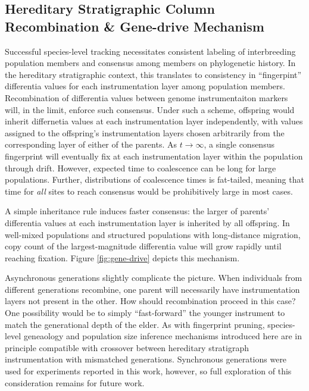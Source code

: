 \subsection{Hereditary Stratigraphic Column Recombination \& Gene-drive Mechanism}
\label{sec:gene-drive}



Successful species-level tracking necessitates consistent labeling of interbreeding population members and consensus among members on phylogenetic history.
In the hereditary stratigraphic context, this translates to consistency in ``fingerpint'' differentia values for each instrumentation layer among population members.
Recombination of differentia values between genome instrumentaiton markers will, in the limit, enforce such consensus.
Under such a scheme, offspring would inherit differnetia values at each instrumentation layer independently, with values assigned to the offspring's instrumentation layers chosen arbitrarily from the corresponding layer of either of the parents.
As $t \to \infty$, a single consensus fingerprint will eventually fix at each instrumentation layer within the population through drift.
However, expected time to coalescence can be long for large populations.
Further, distributions of coalescence times is fat-tailed, meaning that time for \textit{all} sites to reach consensus would be prohibitively large in most cases.

A simple inheritance rule induces faster consensus: the larger of parents' differentia values at each instrumentation layer is inherited by all offspring.
In well-mixed populations and structured populations with long-distance migration, copy count of the largest-magnitude differentia value will grow rapidly until reaching fixation.
Figure \ref{fig:gene-drive} depicts this mechanism.

Asynchronous generations slightly complicate the picture.
When individuals from different generations recombine, one parent will necessarily have instrumentation layers not present in the other.
How should recombination proceed in this case?
One possibility would be to simply ``fast-forward'' the younger instrument to match the generational depth of the elder.
As with fingerprint pruning, species-level geneaology and population size inference mechanisms introduced here are in principle compatible with crossover between hereditary stratigraph instrumentation with mismatched generations.
Synchronous generations were used for experiments reported in this work, however, so full exploration of this consideration remains for future work.

